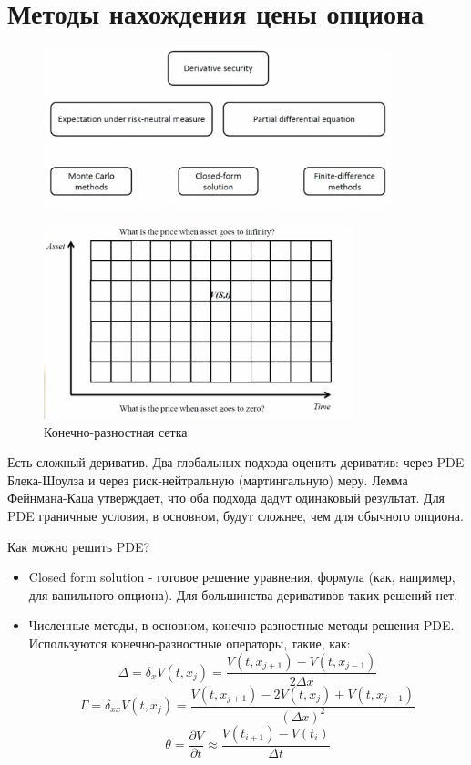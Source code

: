 \documentclass{article}
\begin{document}
\section{Методы нахождения цены опциона}

\begin{figure}[h]
    \centering \includegraphics[width=0.9\textwidth]{scheme.png}
\end{figure}
\begin{figure}[h!]
    \centering \includegraphics[width=0.8\textwidth]{net.png}
    \caption{Конечно-разностная сетка}
\end{figure}

Есть сложный дериватив. Два глобальных подхода оценить дериватив: через PDE Блека-Шоулза и через риск-нейтральную (мартингальную) меру. Лемма Фейнмана-Каца утверждает, что оба подхода дадут одинаковый результат. Для PDE граничные условия, в основном, будут сложнее, чем для обычного опциона. 

Как можно решить PDE? 
\begin{itemize}
    \item Closed form solution - готовое решение уравнения, формула (как, например, для ванильного опциона). Для большинства деривативов таких решений нет.
    
    \item Численные методы, в основном, конечно-разностные методы решения PDE. Используются конечно-разностные операторы, такие, как: 
    \[\Delta = \delta_{x} V(t, x_j) = \frac{V(t, x_{j+1}) - V(t, x_{j-1})}{2\Delta x}\]
    \[\Gamma = \delta_{xx} V(t, x_j) = \frac{V(t, x_{j+1}) - 2V(t, x_{j}) + V(t, x_{j-1})}{(\Delta x)^2}\]
    \[\theta =  \frac{\partial V}{\partial t} \approx \frac{V(t_{i+1}) - V(t_i)}{\Delta t}\]

\end{itemize}
\end{document}
